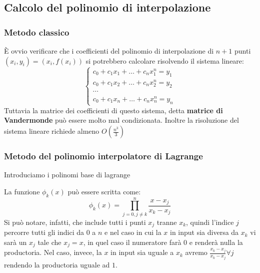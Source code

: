 
\subsection{Calcolo del polinomio di interpolazione}

\subsubsection{Metodo classico}
È ovvio verificare che i coefficienti del polinomio di interpolazione di $n+1$ punti $(x_i, y_i)=(x_i, f(x_i))$ si potrebbero calcolare risolvendo il sistema lineare:
\[
    \begin{cases}
        c_0 + c_1x_1 + \dots + c_n x^n_1 = y_1 \\
        c_0 + c_1x_2 + \dots + c_n x^n_2 = y_2 \\
        \cdots \\
        c_0 + c_1x_n + \dots + c_n x^n_n = y_n
    \end{cases}
\]
Tuttavia la matrice dei coefficienti di questo sistema, detta \textbf{matrice di Vandermonde} può essere molto mal condizionata. Inoltre la risoluzione del sistema lineare richiede almeno $O(\frac{n^3}{3})$

\subsubsection{Metodo del polinomio interpolatore di Lagrange}

Introduciamo i polinomi base di lagrange

La funzione $\phi_k(x)$ può essere scritta come:
\[
    \phi_k(x) = \prod_{j=0, j\neq k} ^ n \frac{x - x_j}{x_k - x_j}
\]
Si può notare, infatti, che include tutti i punti $x_j$ tranne $x_k$, quindi l'indice $j$ percorre tutti gli indici da $0$ a $n$ e nel caso in cui la $x$ in input sia diversa da $x_k$ vi sarà un $x_j$ tale che $x_j = x$, in quel caso il numeratore farà $0$ e renderà nulla la productoria. Nel caso, invece, la $x$ in input sia uguale a $x_k$ avremo $\frac{x_k - x_j}{x_k - x_j} \forall j$ rendendo la productoria uguale ad $1$.


